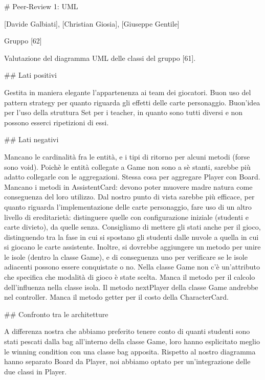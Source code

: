 
# Peer-Review 1: UML

[Davide Galbiati], [Christian Giosia], [Giuseppe Gentile]

Gruppo [62]

Valutazione del diagramma UML delle classi del gruppo [61].

## Lati positivi

Gestita in maniera elegante l'appartenenza ai team dei giocatori.
Buon uso del pattern strategy per quanto riguarda gli effetti delle carte personaggio. Buon'idea per l'uso della struttura Set per i teacher, in quanto sono tutti diversi e non possono esserci ripetizioni di essi.

## Lati negativi

Mancano le cardinalità fra le entità, e i tipi di ritorno per alcuni metodi (forse sono void).
Poichè le entità collegate a Game non sono a sè stanti, sarebbe più adatto collegarle con le aggregazioni. Stessa cosa per aggregare Player con Board.
Mancano i metodi in AssistentCard: devono poter muovere madre natura come conseguenza del loro utilizzo.
Dal nostro punto di vista sarebbe più efficace, per quanto riguarda l'implementazione delle carte personaggio, fare uso di un altro livello di ereditarietà: distinguere quelle con configurazione iniziale (studenti e carte divieto), da quelle senza.
Consigliamo di mettere gli stati anche per il gioco, distinguendo tra la fase in cui si spostano gli studenti dalle nuvole a quella in cui si giocano le carte assistente. Inoltre, si dovrebbe aggiungere un metodo per unire le isole (dentro la classe Game), e di conseguenza uno per verificare se le isole adiacenti possono essere conquistate o no.
Nella classe Game non c'è un'attributo che specifica che modalità di gioco è state scelta.
Manca il metodo per il calcolo dell'influenza nella classe isola.
Il metodo nextPlayer della classe Game andrebbe nel controller. 
Manca il metodo getter per il costo della CharacterCard.

## Confronto tra le architetture

A differenza nostra che abbiamo preferito tenere conto di quanti studenti sono stati pescati dalla bag all'interno della classe Game, loro hanno esplicitato meglio le winning condition con una classe bag apposita.
Rispetto al nostro diagramma hanno separato Board da Player, noi abbiamo optato per un'integrazione delle due classi in Player. 

